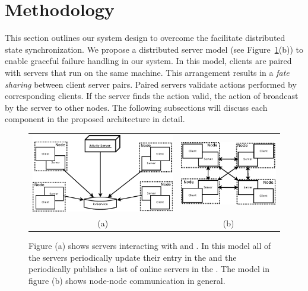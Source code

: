 
\section{Methodology}
\label{sec:methodology}

	This section outlines our system design to overcome the facilitate distributed state synchronization. We propose a distributed server model (see Figure~\ref{figure:server-models}(b)) to enable graceful failure handling in our system. In this model, clients are paired with servers that run on the same machine. This arrangement results in a \emph{fate sharing} between client server pairs. Paired servers validate actions performed by corresponding clients. If the server finds the action valid, the action of broadcast by the server to other nodes. The following subsections will discuss each component in the proposed architecture in detail.

\begin{figure}[ht]
	\centering
	\begin{tabular}{c c}
		
		\includegraphics[width=0.52\linewidth]{../images/client-distributed-server-model-Activity-crop.pdf} &
		\includegraphics[width=0.40\linewidth]{../images/client-distributed-server-model-crop.pdf} \\
		(a) & (b)
	\end{tabular}
	\caption{\label{figure:server-models} Figure (a) shows servers interacting with \activityServer and \kvService. In this model all of the servers periodically update their entry in the \kvService and the \activityServer periodically publishes a list of online servers in the \kvService. The model in figure (b) shows node-node communication in general.}

\end{figure}


